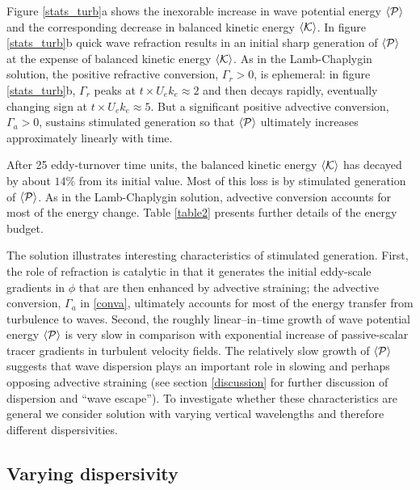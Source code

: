 \documentclass{jfm}
\begin{document}
Figure \ref{stats_turb}a shows the inexorable increase in wave potential energy $\langle \mathcal{P}\rangle$ and the corresponding decrease in balanced kinetic energy $\langle \mathcal{K} \rangle$. In figure \ref{stats_turb}b quick wave refraction results in an  initial sharp generation of $\langle \mathcal{P}\rangle$  at the expense of balanced kinetic energy $\langle \mathcal{K}\rangle$.  As in the Lamb-Chaplygin solution, the positive refractive
conversion, $\Gamma_r > 0$, is ephemeral: in figure \ref{stats_turb}b, $\Gamma_r$  peaks at $t\times U_e k_e \approx 2$ and then decays
rapidly, eventually changing sign at $t\times U_e k_e \approx 5$.
But a significant positive advective conversion, $\Gamma_a> 0$, sustains  stimulated generation so that  $\langle \mathcal{P}\rangle$
ultimately increases approximately linearly with time.

After 25 eddy-turnover time units, the balanced kinetic energy $\langle \mathcal{K}\rangle$ has decayed by about
$14 \%$ from its  initial value. Most of this loss  is
by  stimulated generation of $\langle \mathcal{P}\rangle$. As in the Lamb-Chaplygin solution,
advective conversion accounts for most of the energy change. Table \ref{table2}
presents further details of the energy budget.

The solution illustrates  interesting characteristics of  stimulated generation. First, the role of refraction is catalytic in that it generates the initial eddy-scale gradients in  $\phi$
that are then enhanced by advective straining; the advective conversion, $\Gamma_a$ in \eqref{conva}, ultimately  accounts for most of the energy transfer from turbulence  to waves. Second, the roughly linear--in--time growth of  wave potential energy $\langle \mathcal{P}\rangle$ is very slow in comparison with exponential increase of  passive-scalar tracer gradients in turbulent velocity fields. The relatively  slow
growth  of $\langle \mathcal{P}\rangle$ suggests that wave dispersion plays an important role in slowing and perhaps opposing
advective straining (see section \ref{discussion} for further discussion of dispersion and ``wave escape''). To investigate whether these characteristics are general we consider
solution with varying vertical wavelengths and therefore different dispersivities.

\subsection{Varying dispersivity \label{dummy}}
\end{document}
